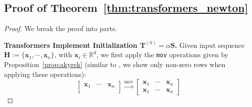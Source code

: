 \documentclass[11pt]{article}
\theoremstyle{plain}
\theoremstyle{definition}
\theoremstyle{remark}
\renewcommand{\^}[1]{^{(#1)}}
\newcommand{\bx}{\boldsymbol{x}}
\newcommand{\bH}{\boldsymbol{H}}
\newcommand{\bS}{\boldsymbol{S}}
\newcommand{\bT}{\boldsymbol{T}}
\renewcommand{\paragraph}[1]{\vspace{1mm}\noindent\textbf{#1}}
\begin{document}
\subsection{Proof of Theorem~\ref{thm:transformers_newton}}
\TransformersNewton*
\begin{proof} We break the proof into parts.

\paragraph{Transformers Implement Initialization $\bT^{(0)}  = \alpha \bS$.} 
Given input sequence $\bH := \{\bx_1, \cdots, \bx_n\}$, with $\bx_i \in \mathbb R^d$,  we first apply the \verb|mov| operations given by Proposition~\ref{prop:akyrek} (similar to \cite{Akyrek2022WhatLA}, we show only non-zero rows when applying these operations):
\begin{equation}
    \begin{bmatrix}
        \bx_1 & \cdots & \bx_n \\
        & & 
    \end{bmatrix} \overset{\mathrm{mov}}{\longrightarrow} \begin{bmatrix}
        \bx_1 & \cdots & \bx_n  \\
        \bx_1 & \cdots & \bx_n 
    \end{bmatrix}
\end{equation}


\end{proof}
\end{document}
